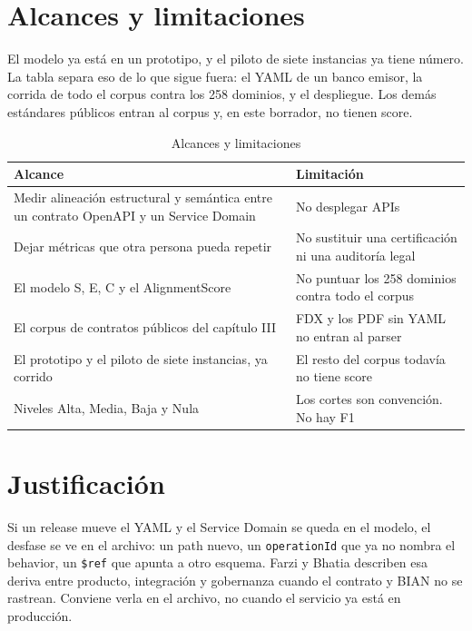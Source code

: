 \section{Alcances y limitaciones}
\label{sec:alcances}

El modelo ya está en un prototipo, y el piloto de siete instancias ya tiene número. La tabla separa eso de lo que sigue fuera: el YAML de un banco emisor, la corrida de todo el corpus contra los 258 dominios, y el despliegue. Los demás estándares públicos entran al corpus y, en este borrador, no tienen score.

\begin{table}[H]
  \centering
  \caption{Alcances y limitaciones}
  \label{tab:alcances}
  \footnotesize
  \begin{tabular}{@{}p{}p{}@{}}
    \toprule
    Alcance & Limitación \\
    \midrule
    Medir alineación estructural y semántica entre un contrato OpenAPI y un Service Domain & No desplegar APIs \\
    Dejar métricas que otra persona pueda repetir & No sustituir una certificación ni una auditoría legal \\
    El modelo S, E, C y el AlignmentScore & No puntuar los 258 dominios contra todo el corpus \\
    El corpus de contratos públicos del capítulo III & FDX y los PDF sin YAML no entran al parser \\
    El prototipo y el piloto de siete instancias, ya corrido & El resto del corpus todavía no tiene score \\
    Niveles Alta, Media, Baja y Nula & Los cortes son convención. No hay F1 \\
    \bottomrule
  \end{tabular}
\end{table}

\section{Justificación}

Si un release mueve el YAML y el Service Domain se queda en el modelo, el desfase se ve en el archivo: un path nuevo, un \texttt{operationId} que ya no nombra el behavior, un \texttt{\$ref} que apunta a otro esquema. Farzi \cite{Farzi2021} y Bhatia \cite{Bhatia2022} describen esa deriva entre producto, integración y gobernanza cuando el contrato y BIAN no se rastrean. Conviene verla en el archivo, no cuando el servicio ya está en producción.

